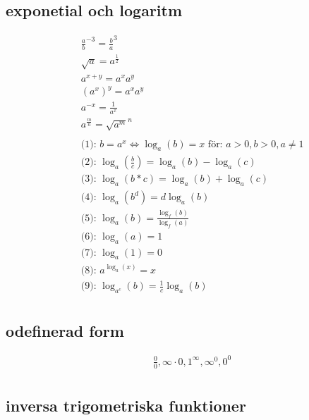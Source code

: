 \documentclass{article}
\begin{document}
\subsection{exponetial och logaritm}  %
\begin{align*}
  &\quad {\frac{a}{b}}^{-3} = {\frac{b}{a}}^{3} \\
  &\quad \sqrt{a} = a^{\frac{1}{2}} \\
  &\quad a^{x+y}=a^{x}a^{y} \\
  &\quad {(a^{x})}^y=a^{x}a^{y} \\
  &\quad a^{-x}=\frac{1}{a^x} \\
  &\quad a^{\frac{m}{n}}={\sqrt{a^{m}}}^{n} \\
  &\quad  \\
  &\quad \text{(1): } b = a^x \Leftrightarrow \log_a(b) = x  \text{ för: } a>0, b>0, a \ne 1  \\
  &\quad \text{(2): } \log_a(\frac{b}{c}) = \log_a(b) - \log_a(c) \\
  &\quad \text{(3): } \log_a(b*c) = \log_a(b) + \log_a(c) \\
  &\quad \text{(4): } \log_a(b^d) = d\log_a(b) \\
  &\quad \text{(5): } \log_a(b) = \frac{\log_f(b)}{\log_f(a)} \\
  &\quad \text{(6): } \log_a(a) = 1 \\
  &\quad \text{(7): } \log_a(1) = 0 \\
  &\quad \text{(8): } a^{\log_a(x)} = x \\
  &\quad \text{(9): } \log_{a^c}(b) = \frac{1}{c} \log_a(b) \\
\end{align*}



\subsection{odefinerad form}
\begin{align*}
  &\quad  \frac{0}{0},\infty\cdot{0},1^{\infty},\infty^0,0^0 \\
\end{align*}


\newpage

\subsection{inversa trigometriska funktioner}
\end{document}
